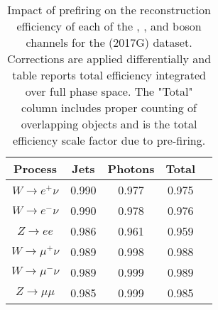 \begin{table}[htbp]
\begin{center}
\begin{tabular}{|c|c|c|c|c|}
\hline
Process & Jets & Photons & Total \\\hline \hline
$W\rightarrow e^+\nu$      & 0.990 & 0.977 & 0.975 \\
$W\rightarrow e^-\nu$      & 0.990 & 0.978 & 0.976 \\
$Z\rightarrow ee$          & 0.986 & 0.961 & 0.959 \\
\hline
$W\rightarrow \mu^+\nu$   & 0.989 & 0.998 & 0.988 \\
$W\rightarrow \mu^-\nu$   & 0.989 & 0.999 & 0.989\\
$Z\rightarrow \mu\mu$     & 0.985 & 0.999 & 0.985 \\
\hline
\end{tabular} 
\end{center}


\caption{Impact of prefiring on the reconstruction efficiency of each of the \Wp, \Wm, and \Z boson channels for the \sg (2017G) dataset. Corrections are applied differentially and table reports total efficiency integrated over full phase space. The "Total" column includes proper counting of overlapping objects and is the total efficiency scale factor due to pre-firing.}
\label{tab:prefire:5}
\end{table}
